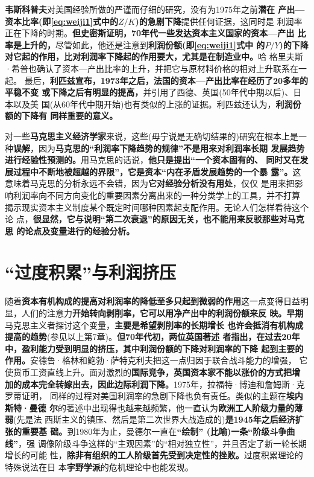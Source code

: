 \textbf{韦斯科普夫}对美国经验所做的严谨而仔细的研究，没有为1975年之前\textbf{潜在
  产出—资本比率(即\eqref{eq:weiji1}式中的$Z/K$)的急剧下降}提供任何证据，这同时是
利润率正在下降的时期。\textbf{但史密斯证明，70年代一些发达资本主义国家的资本—产出
  比率是上升的，}尽管如此，他还是注意到\textbf{利润份额(即\eqref{eq:weiji1}式中
  的$P / Y$)的下降对它起的作用，比对利润率下降起的作用要大，尤其是在制造业中。}哈
格里夫斯·希普也确认了资本—产出比率的上升，并把它与原材料价格的相对上升联系在一起。
最后，\textbf{利匹兹宣布，1973年之后，法国的资本—产出比率在经历了20多年的平稳不变
  或下降之后有明显的提高，}并引用了西德、英国(50年代中期以后)、日本以及美
国(从60年代中期开始)也有类似的上涨的证据。利匹兹还认为，\textbf{利润份额的下降有
  同样重要的意义。}

对一些\textbf{马克思主义经济学家}来说，这些(毋宁说是无确切结果的)研究在根本上是一
种\textbf{误解}，因为\textbf{马克思的“利润率下降趋势的规律”不是用来对利润率长期
  发展趋势进行经验性预测的。}用马克思的话说，\textbf{他只是提出“一个资本固有的、
  同时又在发展过程中不断地被超越的界限”，它是资本“内在矛盾发展趋势的一个暴
  露”。}这意味着马克思的分析永远不会错，因为\textbf{它对经验分析没有用处}，仅仅
是用来把影响利润率向不同方向变化的重要因素分离出来的一种分类学上的工具，并不打算
揭示现实资本主义制度某个既定时间哪种因素起支配作用。无论人们怎样看待这个论
点，\textbf{很显然，它与说明“第二次衰退”的原因无关，也不能用来反驳那些对马克思
  的论点及变量进行的经验分析。}


\section{“过度积累”与利润挤压}

随着\textbf{资本有机构成的提高对利润率的降低至多只起到微弱的作用}这一点变得日益明
显，人们的注意力\textbf{开始转向剥削率，它可以用净产出中的利润份额来反
  映。}\textbf{早期}马克思主义者探讨这个变量，\textbf{主要是希望剥削率的长期增长
  也许会抵消有机构成提高的趋势}(参见以上第7章)。\textbf{但70年代初，两位英国著述
  者指出，在过去20年中，盈利能力受到明显的挤压，其中利润份额的下降对利润率的下降
  起到主要的作用。}安德鲁·格林和鲍勃·萨特克利夫把这一点归因于联合战斗能力的增强，
它使货币工资直线上升。面对激烈的\textbf{国际竞争，英国资本家不能以涨价的方式把增
  加的成本完全转嫁出去，因此边际利润下降。}1975年，拉福特·博迪和詹姆斯·克罗蒂证明，
同样的过程对美国利润率的急剧下降也负有责任。类似的主题在\textbf{埃内斯特·曼德
  尔}的著述中出现得也越来越频繁，他一直认为\textbf{欧洲工人阶级力量的薄弱}(先是法
西斯主义的镇压、然后是第二次世界大战造成的)\textbf{是1945年之后经济扩张的重要基
  础。}到1980年为止，曼德尔一直在\textbf{“绘制” (比喻)一条“阶级斗争曲线”}，强
调像阶级斗争这样的“主观因素”的“相对独立性”，并且否定了新一轮长期增长的可能
性，\textbf{除非有组织的工人阶级首先受到决定性的挫败。}过度积累理论的特殊说法在日
本\textbf{宇野学派}的危机理论中也能发现。

